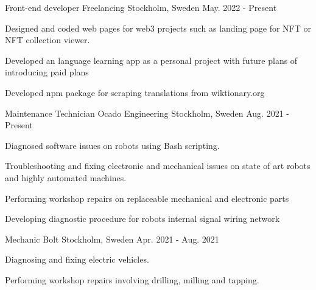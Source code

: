 

\begin{cventries}

  \cventry
    {Front-end developer} %
    {Freelancing} %
    {Stockholm, Sweden} %
    {May. 2022 - Present} %
    {
      \begin{cvitems} %
        \item {Designed and coded web pages for web3 projects such as landing page for NFT or NFT collection viewer. }
        \item {Developed an language learning app as a personal project with future plans of introducing paid plans}
        \item {Developed npm package for scraping translations from wiktionary.org}
        
      \end{cvitems}
    }
  \cventry
    {Maintenance Technician} %
    {Ocado Engineering} %
    {Stockholm, Sweden} %
    {Aug. 2021 - Present} %
    {
      \begin{cvitems} %
      \item{Diagnosed software issues on robots using Bash scripting.}
        \item {Troubleshooting and fixing electronic and mechanical issues on state of art robots and highly automated machines.}
        \item {Performing workshop repairs on replaceable mechanical and electronic parts}
        \item {Developing diagnostic procedure for robots internal signal wiring network}
      \end{cvitems}
    }
    
  \cventry
    {Mechanic} %
    {Bolt} %
    {Stockholm, Sweden} %
    {Apr. 2021 - Aug. 2021} %
    {
      \begin{cvitems} %
      \item{Diagnosing and fixing electric vehicles.}
      \item{Performing workshop repairs involving drilling, milling and tapping.}
      \end{cvitems}
    }
    

\end{cventries}
